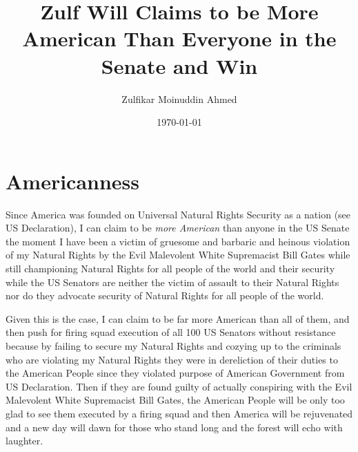 \documentclass{amsart}
\title{Zulf Will Claims to be More American Than Everyone in the Senate and Win}
\author{Zulfikar Moinuddin Ahmed}
\date{\today}
\begin{document}
\maketitle

\section{Americanness}

Since America was founded on Universal Natural Rights Security as a nation (see US Declaration), I can claim to be {\em more American} than anyone in the US Senate the moment I have been a victim of gruesome and barbaric and heinous violation of my Natural Rights by the Evil Malevolent White Supremacist Bill Gates while still championing Natural Rights for all people of the world and their security while the US Senators are neither the victim of assault to their Natural Rights nor do they advocate security of Natural Rights for all people of the world.  

Given this is the case, I can claim to be far more American than all of them, and then push for firing squad execution of all 100 US Senators without resistance because by failing to secure my Natural Rights and cozying up to the criminals who are violating my Natural Rights they were in dereliction of their duties to the American People since they violated purpose of American Government from US Declaration. Then if they are found guilty of actually conspiring with the Evil Malevolent White Supremacist Bill Gates, the American People will be only too glad to see them executed by a firing squad and then America will be rejuvenated and a new day will dawn for those who stand long and the forest will echo with laughter.
\end{document}
